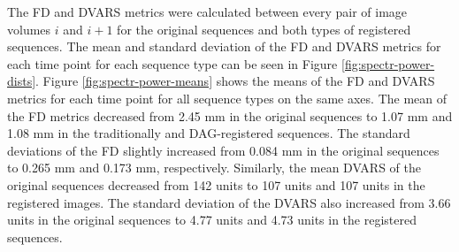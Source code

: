 The FD and DVARS metrics were calculated between every pair of image volumes $i$ and $i+1$ for the original sequences and both types of registered sequences. The mean and standard deviation of the FD and DVARS metrics for each time point for each sequence type can be seen in Figure \ref{fig:spectr-power-dists}. Figure \ref{fig:spectr-power-means} shows the means of the FD and DVARS metrics for each time point for all sequence types on the same axes. The mean of the FD metrics decreased from 2.45 mm in the original sequences to 1.07 mm and 1.08 mm in the traditionally and DAG-registered sequences. The standard deviations of the FD slightly increased from 0.084 mm in the original sequences to 0.265 mm and 0.173 mm, respectively. Similarly, the mean DVARS of the original sequences decreased from 142 units to 107 units and 107 units in the registered images. The standard deviation of the DVARS also increased from 3.66 units in the original sequences to 4.77 units and 4.73 units in the registered sequences.

